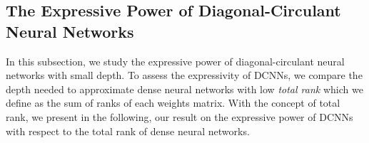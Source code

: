 




\subsection{The Expressive Power of Diagonal-Circulant Neural Networks}
\label{subsection:ch4-on_the_expressive_power_of_diagonal-circulant_neural_networks}




In this subsection, we study the expressive power of diagonal-circulant neural networks with small depth.
To assess the expressivity of DCNNs, we compare the depth needed to approximate dense neural networks with low \emph{total rank} which we define as the sum of ranks of each weights matrix.
With the concept of total rank, we present in the following,  our result on the expressive power of DCNNs with respect to the total rank of dense neural networks.



